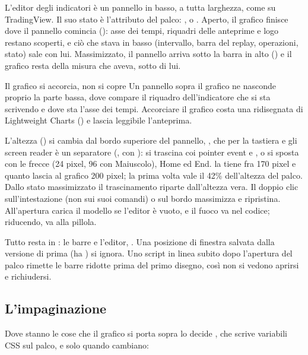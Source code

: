 L'editor degli indicatori è un pannello in basso, a tutta larghezza, come su
TradingView. Il suo stato è l'attributo  del palco:
,  o . Aperto, il grafico finisce dove
il pannello comincia (): asse dei tempi,
riquadri delle anteprime e logo restano scoperti, e ciò che stava in basso
(intervallo, barra del replay, operazioni, stato) sale con lui. Massimizzato,
il pannello arriva sotto la barra in alto () e il grafico
resta della misura che aveva, sotto di lui.

\begin{perche}{Il grafico si accorcia, non si copre}
Un pannello sopra il grafico ne nasconde proprio la parte bassa, dove
compare il riquadro dell'indicatore che si sta scrivendo e dove sta l'asse
dei tempi. Accorciare il grafico costa una ridisegnata di Lightweight Charts
() e lascia leggibile l'anteprima.
\end{perche}

L'altezza () si cambia dal bordo superiore del pannello,
, che per la tastiera e gli screen reader è un separatore
(, con ): si trascina coi pointer
event e , o si sposta con le frecce (24 pixel, 96 con
Maiuscolo), Home ed End.  la tiene fra 170
pixel e quanto lascia al grafico 200 pixel; la prima volta vale il 42\%
dell'altezza del palco. Dallo stato massimizzato il trascinamento riparte
dall'altezza vera. Il doppio clic sull'intestazione (non sui suoi comandi) o
sul bordo massimizza e ripristina. All'apertura 
carica il modello se l'editor è vuoto, e il fuoco va nel codice; riducendo,
va alla pillola.

Tutto resta in : le barre e l'editor,
. Una posizione di finestra salvata dalla versione di
prima (ha ) si ignora. Uno script in linea subito dopo l'apertura del
palco rimette le barre ridotte prima del primo disegno, così non si vedono
aprirsi e richiudersi.

\subsection{L'impaginazione}

Dove stanno le cose che il grafico si porta sopra lo decide
, che scrive variabili CSS sul palco, e solo quando
cambiano:

